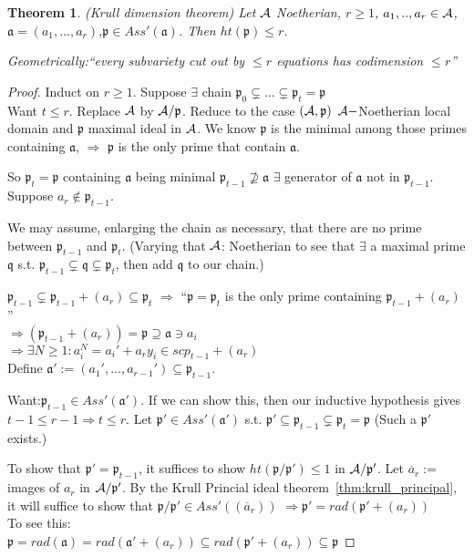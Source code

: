 \documentclass[11pt]{article}
\newtheorem{thm}{Theorem}[section]
\newcommand{\sca}{{\mathfrak a}}
\newcommand{\scp}{{\mathfrak p}}
\newcommand{\scq}{\mathfrak q}
\newcommand{\cala}{{\cal A}}
\newcommand{\Lrta}{\Longrightarrow}
\begin{document}
\begin{thm}\label{thm:Krull_dimension}
(Krull dimension theorem)
Let $\cala$ Noetherian, $r\geq 1$, $a_1,..,a_r\in\cala$, $\sca=(a_1,...,a_r)$,$\scp\in Ass'(\sca)$. Then $ht(\scp)\leq r$.

Geometrically:``every subvariety cut out by $\leq r$ equations has codimension $\leq r$''

\end{thm}
\begin{proof}
Induct on $r\geq 1$. Suppose $\exists $ chain $\scp_0\subsetneq...\subsetneq\scp_t=\scp$\\
Want $t\leq r$. Replace $\cala$ by $\cala/\scp$. Reduce to the case $(\cala,\scp)$ $\cala-$Noetherian local domain and $\scp$ maximal ideal in $\cala$. We know $\scp$ is the minimal among those primes containing $\sca$, $\Lrta$ $\scp$ is the only prime that contain $\sca$.

So $\scp_t=\scp$ containing $\sca$ being minimal $\scp_{t-1}\nsupseteq\sca$ $\exists $ generator of $\sca$ not in $\scp_{t-1}$. Suppose $a_r\notin\scp_{t-1}$.

We may assume, enlarging the chain as necessary, that there are no prime between $\scp_{t-1}$ and $\scp_t$. (Varying that $\cala$: Noetherian to see that $\exists$ a maximal prime $\scq$ s.t. $\scp_{t-1}\subsetneq \scq\subsetneq \scp_t$, then add $\scq$ to our chain.)

$\scp_{t-1}\subsetneq \scp_{t-1}+(a_r)\subseteq\scp_t$ $\Lrta$ ``$\scp=\scp_t$ is the only prime containing $\scp_{t-1}+(a_r)$''\\
$\Lrta(\scp_{t-1}+(a_r))=\scp\supseteq \sca\ni a_i$\\
$\Lrta\exists N\geq 1: a_i^N=a_i'+a_r y_i\in scp_{t-1}+(a_r)$\\
Define $\sca':=(a_1',...,a_{r-1}')\subseteq \scp_{t-1}$.

Want:$\scp_{t-1}\in Ass'(\sca')$. If we can show this, then our inductive hypothesis gives $t-1\leq r-1\Lrta t\leq r$. Let $\scp'\in Ass'(\sca')$ s.t. $\scp'\subseteq \scp_{t-1}\subsetneq \scp_t=\scp$ (Such a $\scp'$ exists.)

To show that $\scp'=\scp_{t-1}$, it suffices to show $ht(\scp/\scp')\leq 1$ in $\cala/\scp'$. Let $\overline{a}_r:=$ images of $a_r$ in $\cala/\scp'$.
By the Krull Princial ideal theorem~\ref{thm:krull_principal}, it will suffice to show that 
$\scp/\scp'\in Ass'((\overline{a}_r))$ $\Lrta \scp'=rad(\scp'+(a_r))$\\
To see this:\\
$\scp=rad(\sca)=rad(\sca'+(a_r))\subseteq rad(\scp'+(a_r))\subseteq \scp$
\end{proof}
\end{document}
